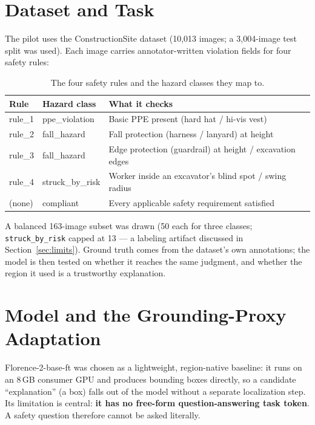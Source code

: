 \documentclass[11pt]{article}
\newcommand{\code}[1]{\texttt{\small #1}}
\begin{document}
\section{Dataset and Task}

The pilot uses the ConstructionSite dataset (10,013 images; a 3,004-image test split was used). Each
image carries annotator-written violation fields for four safety rules:

\begin{table}[h]
\centering
\begin{tabular}{llp{6.4cm}}
\toprule
\textbf{Rule} & \textbf{Hazard class} & \textbf{What it checks} \\
\midrule
rule\_1 & ppe\_violation & Basic PPE present (hard hat / hi-vis vest) \\
rule\_2 & fall\_hazard & Fall protection (harness / lanyard) at height \\
rule\_3 & fall\_hazard & Edge protection (guardrail) at height / excavation edges \\
rule\_4 & struck\_by\_risk & Worker inside an excavator's blind spot / swing radius \\
\midrule
(none) & compliant & Every applicable safety requirement satisfied \\
\bottomrule
\end{tabular}
\caption{The four safety rules and the hazard classes they map to.}
\label{tab:rules}
\end{table}

A balanced 163-image subset was drawn (50 each for three classes; \code{struck\_by\_risk} capped at 13
--- a labeling artifact discussed in Section~\ref{sec:limits}). Ground truth comes from the dataset's
own annotations; the model is then tested on whether it reaches the same judgment, and whether the
region it used is a trustworthy explanation.

\section{Model and the Grounding-Proxy Adaptation}

Florence-2-base-ft was chosen as a lightweight, region-native baseline: it runs on an 8\,GB consumer
GPU and produces bounding boxes directly, so a candidate ``explanation'' (a box) falls out of the model
without a separate localization step. Its limitation is central: \textbf{it has no free-form
question-answering task token}. A safety question therefore cannot be asked literally.
\end{document}
